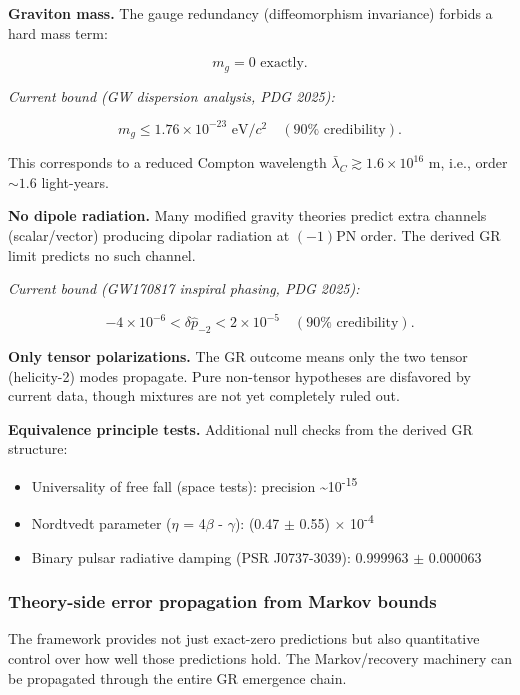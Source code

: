 \documentclass[11pt,a4paper]{article}
\theoremstyle{remark}
\providecommand{\tightlist}{%
  \setlength{\itemsep}{0pt}\setlength{\parskip}{0pt}}
\begin{document}
\textbf{Graviton mass.} The gauge redundancy (diffeomorphism invariance) forbids a
hard mass term:

\[
m_g = 0 \text{ exactly.}
\]

\emph{Current bound (GW dispersion analysis, PDG 2025):}

\[
m_g \le 1.76 \times 10^{-23} \text{ eV}/c^2 \quad (90\% \text{ credibility}).
\]

This corresponds to a reduced Compton wavelength
\(\bar{\lambda}_C \gtrsim 1.6 \times 10^{16}\) m, i.e., order \(\sim 1.6\)
light-years.

\textbf{No dipole radiation.} Many modified gravity theories predict extra channels
(scalar/vector) producing dipolar radiation at \((-1)\)PN order. The derived GR
limit predicts no such channel.

\emph{Current bound (GW170817 inspiral phasing, PDG 2025):}

\[
-4 \times 10^{-6} < \delta\hat{p}_{-2} < 2 \times 10^{-5}
\quad (90\% \text{ credibility}).
\]

\textbf{Only tensor polarizations.} The GR outcome means only the two tensor
(helicity-2) modes propagate. Pure non-tensor hypotheses are disfavored by
current data, though mixtures are not yet completely ruled out.

\textbf{Equivalence principle tests.} Additional null checks from the derived GR
structure:

\begin{itemize}
\tightlist
\item
  Universality of free fall (space tests): precision \textasciitilde10\textsuperscript{-15}
\item
  Nordtvedt parameter (\ensuremath{\eta} = 4\ensuremath{\beta} - \ensuremath{\gamma}): (0.47 \ensuremath{\pm} 0.55) \ensuremath{\times} 10\textsuperscript{-4}
\item
  Binary pulsar radiative damping (PSR J0737-3039): 0.999963 \ensuremath{\pm} 0.000063
\end{itemize}

\subsubsection{Theory-side error propagation from Markov bounds}\label{theory-side-error-propagation-from-markov-bounds}

The framework provides not just exact-zero predictions but also quantitative
control over how well those predictions hold. The Markov/recovery machinery
can be propagated through the entire GR emergence chain.
\end{document}
